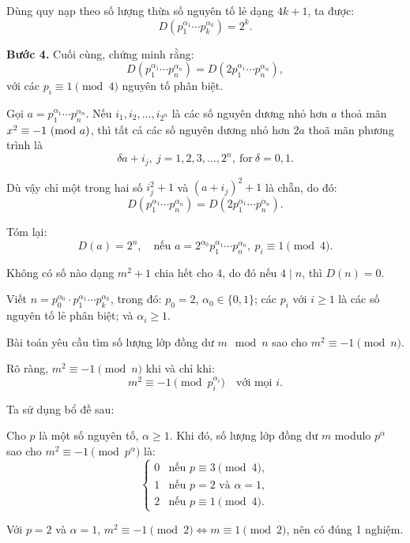 \begin{problem}
\begin{soln}
    Dùng quy nạp theo số lượng thừa số nguyên tố lẻ dạng \( 4k + 1 \), ta được:
    \[
        D(p_1^{\alpha_1} \cdots p_k^{\alpha_k}) = 2^k.
    \]

    \textbf{Bước 4.} Cuối cùng, chứng minh rằng:
    \[
        D(p_1^{\alpha_1} \cdots p_n^{\alpha_n}) = D(2 p_1^{\alpha_1} \cdots p_n^{\alpha_n}),
    \]
    với các \( p_i \equiv 1 \pmod{4} \) nguyên tố phân biệt.

    Gọi \( a = p_1^{\alpha_1} \cdots p_n^{\alpha_n} \). Nếu \( i_1, i_2, \ldots, i_{2^n} \) là các số nguyên dương nhỏ hơn $a$
    thoả mãn $x^2 \equiv -1 \ (\mathrm{mod}\ a)$, thì tất cả các số nguyên dương nhỏ hơn $2a$ thoã mãn phương trình là
    \[
        \delta a + i_j,\ j=1,2,3,\ldots,2^n,\ \text{for}\ \delta = 0, 1.
    \]

    Dù vậy chỉ một trong hai số $i_j^2 + 1$ và $(a + i_j)^2 + 1$ là chẵn, do đó:
    \[
        D(p_1^{\alpha_1} \cdots p_n^{\alpha_n}) = D(2 p_1^{\alpha_1} \cdots p_n^{\alpha_n}).
    \]

    Tóm lại:
    \[
        D(a) = 2^n, \quad \text{nếu } a = 2^{\alpha_0} p_1^{\alpha_1} \cdots p_n^{\alpha_n},\ p_i \equiv 1 \pmod{4}.
    \]
\end{soln}

\newpage

\begin{soln}
    Không có số nào dạng \( m^2 + 1 \) chia hết cho 4, do đó nếu \( 4 \mid n \), thì \( D(n) = 0 \).

    Viết \( n = p_0^{\alpha_0} \cdot p_1^{\alpha_1} \cdots p_k^{\alpha_k} \), trong đó:
    \( p_0 = 2 \), \( \alpha_0 \in \{0,1\} \); các \( p_i \) với \( i \ge 1 \) là các số nguyên tố lẻ phân biệt; và \( \alpha_i \ge 1 \).

    Bài toán yêu cầu tìm số lượng lớp đồng dư \( m \mod n \) sao cho \( m^2 \equiv -1 \pmod{n} \).

    Rõ ràng, \( m^2 \equiv -1 \pmod{n} \) khi và chỉ khi:
    \[
        m^2 \equiv -1 \pmod{p_i^{\alpha_i}} \quad \text{với mọi } i.
    \]

    Ta sử dụng bổ đề sau:
    \begin{lemma*}
        Cho \( p \) là một số nguyên tố, \( \alpha \ge 1 \). Khi đó, số lượng lớp đồng dư \( m \) modulo \( p^\alpha \)
        sao cho \( m^2 \equiv -1 \pmod{p^\alpha} \) là:
        \[
            \begin{cases}
                0 & \text{nếu } p \equiv 3 \pmod{4}, \\
                1 & \text{nếu } p = 2 \text{ và } \alpha = 1, \\
                2 & \text{nếu } p \equiv 1 \pmod{4}.
            \end{cases}
        \]
    \end{lemma*}
    \begin{subproof}
        Với \( p = 2 \) và \( \alpha = 1 \), \( m^2 \equiv -1 \pmod{2} \Leftrightarrow m \equiv 1 \pmod{2} \), nên có đúng 1 nghiệm.


\end{subproof}
\end{soln}
\end{problem}
